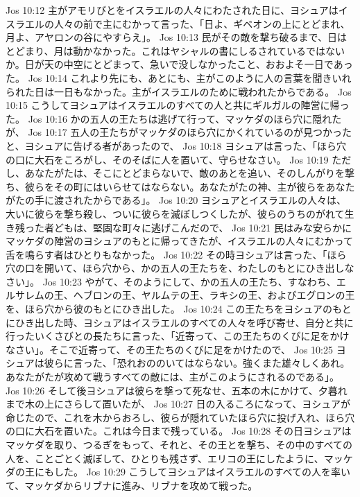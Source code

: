 Jos 10:12  主がアモリびとをイスラエルの人々にわたされた日に、ヨシュアはイスラエルの人々の前で主にむかって言った、「日よ、ギベオンの上にとどまれ、月よ、アヤロンの谷にやすらえ」。
Jos 10:13  民がその敵を撃ち破るまで、日はとどまり、月は動かなかった。これはヤシャルの書にしるされているではないか。日が天の中空にとどまって、急いで没しなかったこと、おおよそ一日であった。
Jos 10:14  これより先にも、あとにも、主がこのように人の言葉を聞きいれられた日は一日もなかった。主がイスラエルのために戦われたからである。
Jos 10:15  こうしてヨシュアはイスラエルのすべての人と共にギルガルの陣営に帰った。
Jos 10:16  かの五人の王たちは逃げて行って、マッケダのほら穴に隠れたが、
Jos 10:17  五人の王たちがマッケダのほら穴にかくれているのが見つかったと、ヨシュアに告げる者があったので、
Jos 10:18  ヨシュアは言った、「ほら穴の口に大石をころがし、そのそばに人を置いて、守らせなさい。
Jos 10:19  ただし、あなたがたは、そこにとどまらないで、敵のあとを追い、そのしんがりを撃ち、彼らをその町にはいらせてはならない。あなたがたの神、主が彼らをあなたがたの手に渡されたからである」。
Jos 10:20  ヨシュアとイスラエルの人々は、大いに彼らを撃ち殺し、ついに彼らを滅ぼしつくしたが、彼らのうちのがれて生き残った者どもは、堅固な町々に逃げこんだので、
Jos 10:21  民はみな安らかにマッケダの陣営のヨシュアのもとに帰ってきたが、イスラエルの人々にむかって舌を鳴らす者はひとりもなかった。
Jos 10:22  その時ヨシュアは言った、「ほら穴の口を開いて、ほら穴から、かの五人の王たちを、わたしのもとにひき出しなさい」。
Jos 10:23  やがて、そのようにして、かの五人の王たち、すなわち、エルサレムの王、ヘブロンの王、ヤルムテの王、ラキシの王、およびエグロンの王を、ほら穴から彼のもとにひき出した。
Jos 10:24  この王たちをヨシュアのもとにひき出した時、ヨシュアはイスラエルのすべての人々を呼び寄せ、自分と共に行ったいくさびとの長たちに言った、「近寄って、この王たちのくびに足をかけなさい」。そこで近寄って、その王たちのくびに足をかけたので、
Jos 10:25  ヨシュアは彼らに言った、「恐れおののいてはならない。強くまた雄々しくあれ。あなたがたが攻めて戦うすべての敵には、主がこのようにされるのである」。
Jos 10:26  そして後ヨシュアは彼らを撃って死なせ、五本の木にかけて、夕暮れまで木の上にさらして置いたが、
Jos 10:27  日の入るころになって、ヨシュアが命じたので、これを木からおろし、彼らが隠れていたほら穴に投げ入れ、ほら穴の口に大石を置いた。これは今日まで残っている。
Jos 10:28  その日ヨシュアはマッケダを取り、つるぎをもって、それと、その王とを撃ち、その中のすべての人を、ことごとく滅ぼして、ひとりも残さず、エリコの王にしたように、マッケダの王にもした。
Jos 10:29  こうしてヨシュアはイスラエルのすべての人を率いて、マッケダからリブナに進み、リブナを攻めて戦った。
